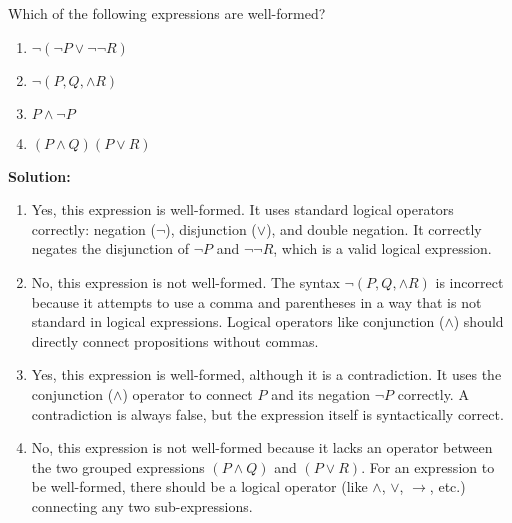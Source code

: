 Which of the following expressions are well-formed?
\begin{enumerate}[label=(\alph*)]
    \item $\neg (\neg P \vee \neg \neg R)$
    \item $\neg (P,Q,\wedge R)$
    \item $P \wedge \neg P$
    \item $(P \wedge Q)(P \vee R)$
\end{enumerate}

    \textbf{Solution:}
\begin{enumerate}[label=(\alph*)]
    \item Yes, this expression is well-formed. It uses standard logical operators correctly: negation ($\neg$), disjunction ($\vee$), and double negation. It correctly negates the disjunction of $\neg P$ and $\neg \neg R$, which is a valid logical expression.
    \item No, this expression is not well-formed. The syntax $\neg (P,Q,\wedge R)$ is incorrect because it attempts to use a comma and parentheses in a way that is not standard in logical expressions. Logical operators like conjunction ($\wedge$) should directly connect propositions without commas.
    \item Yes, this expression is well-formed, although it is a contradiction. It uses the conjunction ($\wedge$) operator to connect $P$ and its negation $\neg P$ correctly. A contradiction is always false, but the expression itself is syntactically correct.
    \item No, this expression is not well-formed because it lacks an operator between the two grouped expressions $(P \wedge Q)$ and $(P \vee R)$. For an expression to be well-formed, there should be a logical operator (like $\wedge$, $\vee$, $\rightarrow$, etc.) connecting any two sub-expressions.
\end{enumerate}

\pagebreak